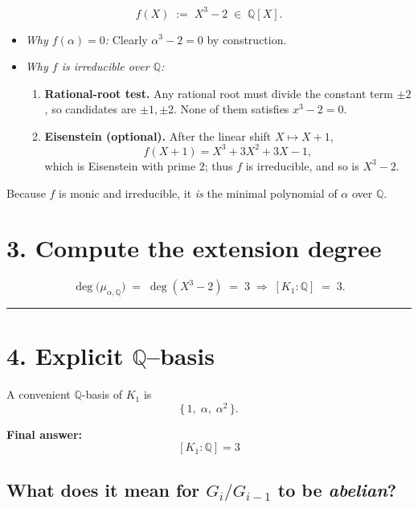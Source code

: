 \documentclass[12pt]{article}
\theoremstyle{definition} %
\theoremstyle{plain} %
\begin{document}
  \[
     f(X)\;:=\;X^{3}-2 \;\in\; \mathbb{Q}[X].
  \]
  \begin{itemize}
     \item \emph{Why $f(\alpha)=0$:}\;
           Clearly $\alpha^{3}-2=0$ by construction.
     \item \emph{Why $f$ is irreducible over $\mathbb{Q}$:}
           \begin{enumerate}
              \item \textbf{Rational-root test.}\;
                    Any rational root must divide the constant term $\pm2$,
                    so candidates are $\pm1,\pm2$.
                    None of them satisfies $x^{3}-2=0$.
              \item \textbf{Eisenstein (optional).}\;
                    After the linear shift $X\mapsto X+1$,
                    \[
                       f(X+1) = X^{3}+3X^{2}+3X-1,
                    \]
                    which is Eisenstein with prime $2$; thus $f$ is
                    irreducible, and so is $X^{3}-2$.
           \end{enumerate}
  \end{itemize}
  
  Because $f$ is monic and irreducible, it \emph{is} the minimal
  polynomial of $\alpha$ over $\mathbb{Q}$.
  
  \bigskip
  \section*{3.  Compute the extension degree}
  
  \[
     \deg\bigl(\mu_{\alpha,\mathbb{Q}}\bigr)
     \;=\;\deg(X^{3}-2)
     \;=\;3
     \;\Longrightarrow\;
     [K_1:\mathbb{Q}]
     \;=\;3.
  \]
  
  \bigskip
  \hrule
  \bigskip
  
  \section*{4.  Explicit $\mathbb{Q}$–basis}
  
  A convenient $\mathbb{Q}$-basis of $K_1$ is
  \[
     \bigl\{\,1,\;\alpha,\;\alpha^{2}\,\bigr\}.
  \]
  
  \bigskip
  \noindent
  \textbf{Final answer:}\;
  \[
     \boxed{\; [K_1:\mathbb{Q}] = 3 \;}
  \]
\subsection*{What does it mean for \(G_i/G_{i-1}\) to be \emph{abelian}?}
\end{document}

